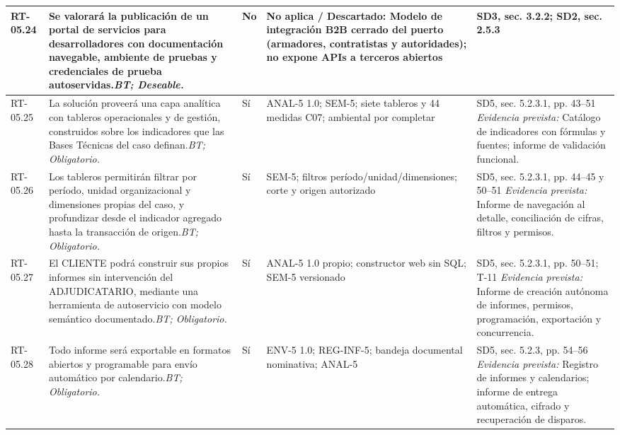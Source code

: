 \begin{paginaHorizontalSynaptix}
\begin{longtable}{|L{0.09\AnchoMatrizTDoce}|L{0.385\AnchoMatrizTDoce}|L{0.065\AnchoMatrizTDoce}|L{0.18\AnchoMatrizTDoce}|L{0.28\AnchoMatrizTDoce}|}
RT-\allowbreak{}05.\allowbreak{}24 &
Se valorará la publicación de un portal de servicios para desarrolladores con documentación navegable, ambiente de pruebas y credenciales de prueba autoservidas.\newline\textit{BT; Deseable.} &
No &
No aplica / Descartado: Modelo de integración B2B cerrado del puerto (armadores, contratistas y autoridades); no expone APIs a terceros abiertos &
SD3, sec. 3.2.2; SD2, sec. 2.5.3 \\ \hline

RT-\allowbreak{}05.\allowbreak{}25 &
La solución proveerá una capa analítica con tableros operacionales y de gestión, construidos sobre los indicadores que las Bases Técnicas del caso definan.\newline\textit{BT; Obligatorio.} &
Sí &
ANAL-5 1.0; SEM-5; siete tableros y 44 medidas C07; ambiental por completar &
SD5, sec. 5.2.3.1, pp. 43--51 \newline\textit{Evidencia prevista:} Catálogo de indicadores con fórmulas y fuentes; informe de validación funcional. \\ \hline

RT-\allowbreak{}05.\allowbreak{}26 &
Los tableros permitirán filtrar por período, unidad organizacional y dimensiones propias del caso, y profundizar desde el indicador agregado hasta la transacción de origen.\newline\textit{BT; Obligatorio.} &
Sí &
SEM-5; filtros período/\allowbreak{}unidad/\allowbreak{}dimensiones; corte y origen autorizado &
SD5, sec. 5.2.3.1, pp. 44--45 y 50--51 \newline\textit{Evidencia prevista:} Informe de navegación al detalle, conciliación de cifras, filtros y permisos. \\ \hline

RT-\allowbreak{}05.\allowbreak{}27 &
El CLIENTE podrá construir sus propios informes sin intervención del ADJUDICATARIO, mediante una herramienta de autoservicio con modelo semántico documentado.\newline\textit{BT; Obligatorio.} &
Sí &
ANAL-5 1.0 propio; constructor web sin SQL; SEM-5 versionado &
SD5, sec. 5.2.3.1, pp. 50--51; T-11 \newline\textit{Evidencia prevista:} Informe de creación autónoma de informes, permisos, programación, exportación y concurrencia. \\ \hline

RT-\allowbreak{}05.\allowbreak{}28 &
Todo informe será exportable en formatos abiertos y programable para envío automático por calendario.\newline\textit{BT; Obligatorio.} &
Sí &
ENV-5 1.0; REG-INF-5; bandeja documental nominativa; ANAL-5 &
SD5, sec. 5.2.3, pp. 54--56 \newline\textit{Evidencia prevista:} Registro de informes y calendarios; informe de entrega automática, cifrado y recuperación de disparos. \\ \hline


\end{longtable}
\end{paginaHorizontalSynaptix}
